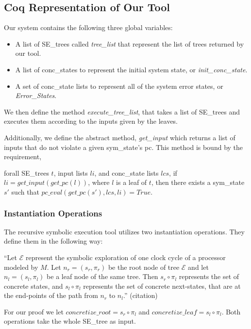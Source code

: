 \subsection{Coq Representation of Our Tool}
Our system contains the following three global variables:
\begin{itemize}
\item A list of SE\_trees called \textit{tree\_list} that represent the list of trees returned by our tool.
\item A list of conc\_states to represent the initial system state, or \textit{init\_conc\_state}.
\item A set of conc\_state lists to represent all of the system error states, or \textit{Error\_States}.
\end{itemize}

We then define the method \textit{execute\_tree\_list}, that takes a list of SE\_trees and executes them according to the inputs given by the leaves.

Additionally, we define the abstract method, \textit{get\_input} which returns a list of inputs that do not violate a given sym\_state's pc.
This method is bound by the requirement,
\begin{axiom}
forall SE\_trees $t$, input lists $li$, and conc\_state lists $lcs$,  
if $li = get\_input (get\_pc (l)) $, where $l$ is a leaf of $t$,
then there exists a sym\_state $s'$ such that
 $pc\_eval (get\_pc (s'), lcs, li) = True$.
\end{axiom}

\subsubsection{Instantiation Operations}
The recursive symbolic execution tool utilizes two instantiation operations. 
They define them in the following way: 

``Let $\mathcal{E}$ represent the symbolic exploration of one clock cycle of a processor modeled by $M$. Let $n_r = (s_r,\pi_r)$ be the root node of tree $\mathcal{E}$ and let $n_l = (s_l,\pi_l)$ be a leaf node of the same tree. 
Then $s_r \circ \pi_l$ represents the set of concrete states, and $s_l \circ \pi_l$ represents the set of concrete next-states, that are at the end-points of the path from $n_r$ to $n_l$.'' (citation)

For our proof we let $concretize\_root=  s_r \circ \pi_l$ and $concretize\_leaf =  s_l \circ \pi_l$.
Both operations take the whole SE\_tree as input.

